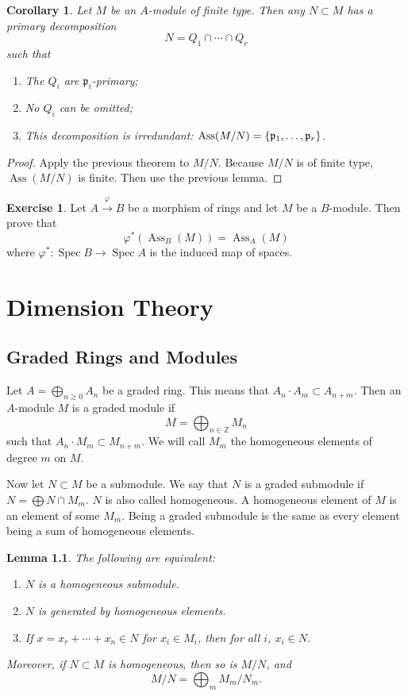 \documentclass[leqno, openany]{memoir}
\newtheorem{cor}[thm]{Corollary}
\newtheorem{lem}[thm]{Lemma}
\theoremstyle{definition}
\newtheorem{exer}[thm]{Exercise}
\theoremstyle{remark}
\theoremstyle{plain}
\theoremstyle{definition}
\theoremstyle{remark}
\newcommand{\Z}{\mathbb{Z}}
\newcommand{\mf}[1]{\mathfrak{#1}}
\DeclareMathOperator{\Spec}{Spec}
\DeclareMathOperator{\Ass}{Ass}
\begin{document}
\begin{cor}
    Let $M$ be an $A$-module of finite type. Then any $N \subset M$ has a primary decomposition
    \[ N = Q_1 \cap \cdots \cap Q_r \]
    such that
    \begin{enumerate}
        \item The $Q_i$ are $\mf{p}_i$-primary;
        \item No $Q_i$ can be omitted;
        \item This decomposition is irredundant: $\Ass(M/N) = \qty{\mf{p}_1, \ldots, \mf{p}_r}$.
    \end{enumerate}
\end{cor}

\begin{proof}
    Apply the previous theorem to $M/N$. Because $M/N$ is of finite type, $\Ass(M/N)$ is finite. Then use the previous lemma.
\end{proof}

\begin{exer}
    Let $A \xrightarrow{\varphi} B$ be a morphism of rings and let $M$ be a $B$-module. Then prove that
    \[ \varphi^*(\Ass_B(M)) = \Ass_A(M) \]
    where $\varphi^* \colon \Spec B \to \Spec A$ is the induced map of spaces.
\end{exer}

\chapter{Dimension Theory}%
\label{cha:dimension_theory}

\section{Graded Rings and Modules}%
\label{sec:graded_rings_and_modules}

Let $A = \bigoplus_{n \geq 0} A_n$ be a graded ring. This means that $A_n \cdot A_m \subset A_{n+m}$. Then an $A$-module $M$ is a graded module if
\[ M = \bigoplus_{n \in \Z} M_n \]
such that $A_n \cdot M_m \subset M_{n+m}$. We will call $M_m$ the homogeneous elements of degree $m$ on $M$.

Now let $N \subset M$ be a submodule. We say that $N$ is a graded submodule if $N = \bigoplus N \cap M_m$. $N$ is also called homogeneous. A homogeneous element of $M$ is an element of some $M_m$. Being a graded submodule is the same as every element being a sum of homogeneous elements.

\begin{lem}
    The following are equivalent:
    \begin{enumerate}
        \item $N$ is a homogeneous submodule.
        \item $N$ is generated by homogeneous elements.
        \item If $x = x_r + \cdots + x_n \in N$ for $x_i \in M_i$, then for all $i$, $x_i \in N$.
    \end{enumerate}
    Moreover, if $N \subset M$ is homogeneous, then so is $M/N$, and
    \[ M/N = \bigoplus_m M_m / N_m. \]
\end{lem}
\end{document}
